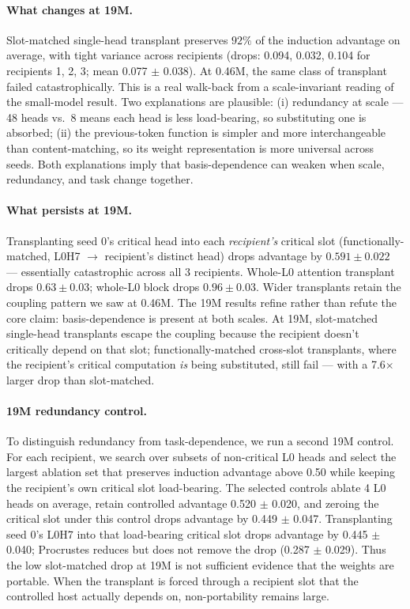 \documentclass[final]{article}
\begin{document}
\paragraph{What changes at 19M.}
Slot-matched single-head transplant preserves $92\%$ of the induction advantage
on average, with tight variance across recipients (drops: 0.094, 0.032, 0.104
for recipients 1, 2, 3; mean 0.077 $\pm$ 0.038). At 0.46M, the same class of
transplant failed catastrophically. This is a real walk-back from a
scale-invariant reading of the small-model result. Two explanations are
plausible: (i) redundancy at scale --- 48 heads vs.\ 8 means each head is less
load-bearing, so substituting one is absorbed; (ii) the previous-token function
is simpler and more interchangeable than content-matching, so its weight
representation is more universal across seeds. Both explanations imply that
basis-dependence can weaken when scale, redundancy, and task change together.

\paragraph{What persists at 19M.}
Transplanting seed 0's critical head into each \emph{recipient's} critical slot
(functionally-matched, L0H7 $\to$ recipient's distinct head) drops advantage by
$0.591 \pm 0.022$ --- essentially catastrophic across all 3 recipients.
Whole-L0 attention transplant drops $0.63 \pm 0.03$; whole-L0 block drops
$0.96 \pm 0.03$. Wider transplants retain the coupling pattern we saw at 0.46M.
The 19M results refine rather than refute the core claim: basis-dependence is
present at both scales. At 19M, slot-matched single-head transplants escape
the coupling because the recipient doesn't critically depend on that slot;
functionally-matched cross-slot transplants, where the recipient's critical
computation \emph{is} being substituted, still fail --- with a 7.6$\times$
larger drop than slot-matched.

\paragraph{19M redundancy control.}
To distinguish redundancy from task-dependence, we run a second 19M control. For
each recipient, we search over subsets of non-critical L0 heads and select the
largest ablation set that preserves induction advantage above 0.50 while
keeping the recipient's own critical slot load-bearing. The selected controls
ablate 4 L0 heads on average, retain controlled advantage 0.520 $\pm$ 0.020,
and zeroing the critical slot under this control drops advantage by
0.449 $\pm$ 0.047. Transplanting seed 0's L0H7 into that load-bearing critical
slot drops advantage by 0.445 $\pm$ 0.040; Procrustes reduces but does not
remove the drop (0.287 $\pm$ 0.029). Thus the low slot-matched drop at 19M is
not sufficient evidence that the weights are portable. When the transplant is
forced through a recipient slot that the controlled host actually depends on,
non-portability remains large.
\end{document}
